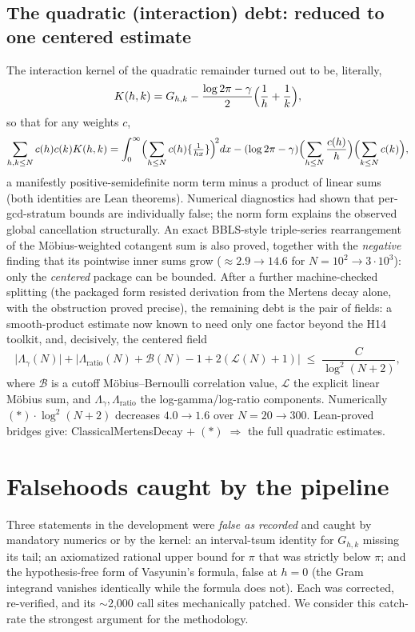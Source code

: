 \documentclass[11pt,a4paper]{article}
\newcommand{\fract}[1]{\{#1\}}
\begin{document}
\subsection{The quadratic (interaction) debt: reduced to one centered estimate}
The interaction kernel of the quadratic remainder turned out to be, literally,
\[
K(h,k)=G_{h,k}-\frac{\log2\pi-\gamma}{2}\Bigl(\frac1h+\frac1k\Bigr),
\]
so that for any weights $c$,
\[
\sum_{h,k\le N}c(h)c(k)K(h,k)
=\int_0^\infty\Bigl(\sum_{h\le N}c(h)\fract{\tfrac1{hx}}\Bigr)^{\!2}dx
-(\log2\pi-\gamma)\Bigl(\sum_{h\le N}\frac{c(h)}{h}\Bigr)\Bigl(\sum_{k\le N}c(k)\Bigr),
\]
a manifestly positive-semidefinite norm term minus a product of linear sums
(both identities are Lean theorems). Numerical diagnostics had shown that
per-gcd-stratum bounds are individually false; the norm form explains the
observed global cancellation structurally. An exact BBLS-style triple-series
rearrangement of the M\"obius-weighted cotangent sum is also proved, together
with the \emph{negative} finding that its pointwise inner sums grow
($\approx2.9\to14.6$ for $N=10^2\to3\cdot10^3$): only the \emph{centered}
package can be bounded. After a further machine-checked splitting (the packaged form resisted derivation from the Mertens decay alone, with the obstruction proved precise), the remaining debt is the pair of fields: a smooth-product estimate now known to need only one factor beyond the H14 toolkit, and, decisively, the centered field
\[
\bigl|\Lambda_\gamma(N)\bigr|
+\bigl|\Lambda_{\mathrm{ratio}}(N)+\mathcal B(N)-1+2(\mathcal L(N)+1)\bigr|
\;\le\;\frac{C}{\log^2(N{+}2)},
\tag{$\ast$}
\]
where $\mathcal B$ is a cutoff M\"obius--Bernoulli correlation value,
$\mathcal L$ the explicit linear M\"obius sum, and
$\Lambda_\gamma,\Lambda_{\mathrm{ratio}}$ the log-gamma/log-ratio components.
Numerically $(\ast)\cdot\log^2(N{+}2)$ decreases $4.0\to1.6$ over
$N=20\to300$. Lean-proved bridges give: \textsf{ClassicalMertensDecay}
$+\;(\ast)\;\Longrightarrow$ the full quadratic estimates.

\section{Falsehoods caught by the pipeline}\label{sec:false}
Three statements in the development were \emph{false as recorded} and caught
by mandatory numerics or by the kernel: an interval-tsum identity for
$G_{h,k}$ missing its tail; an axiomatized rational upper bound for $\pi$
that was strictly below $\pi$; and the hypothesis-free form of Vasyunin's
formula, false at $h=0$ (the Gram integrand vanishes identically while the
formula does not). Each was corrected, re-verified, and its $\sim$2{,}000
call sites mechanically patched. We consider this catch-rate the strongest
argument for the methodology.
\end{document}
